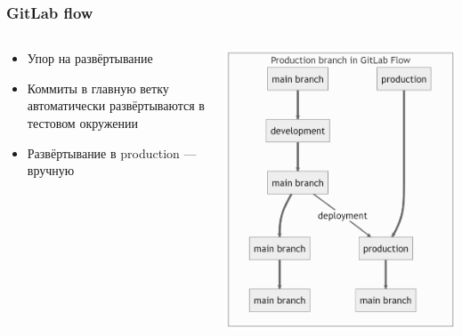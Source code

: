 \documentclass{../../slides-style}
\begin{document}
    \begin{frame}
        \frametitle{GitLab flow}
        \begin{columns}
            \begin{column}{0.6\textwidth}
                \begin{itemize}
                    \item Упор на развёртывание
                    \item Коммиты в главную ветку автоматически развёртываются в тестовом окружении
                    \item Развёртывание в production --- вручную
                \end{itemize}
            \end{column}
            \begin{column}{0.4\textwidth}
                \begin{center}
                    \includegraphics[height=0.6\textheight]{gitlabFlow.png}
                \end{center}
            \end{column}
        \end{columns}
    \end{frame}
\end{document}
